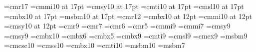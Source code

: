 
%





\font\titlefont=cmr17
\font\titlei=cmmi10 at 17pt
\font\titlesy=cmsy10 at 17pt
\font\titleit=cmti10 at 17pt
\font\titlesl=cmsl10 at 17pt
\font\titlebf=cmbx10 at 17pt
\font\Bbbt=msbm10 at 17pt
\font\twelverm=cmr12
\font\twelvebf=cmbx10 at 12pt
\font\twelvei=cmmi10 at 12pt
\font\twelvesy=cmsy10 at 12pt
\font\ninerm=cmr9
\font\sevenrm=cmr7
\font\sixrm=cmr6
\font\fiverm=cmr5
\font\ninei=cmmi9
\font\seveni=cmmi7
\font\ninesy=cmsy9
\font\sevensy=cmsy9
\font\tenbf=cmbx10
\font\sixbf=cmbx6
\font\fivebf=cmbx5
\font\ninebf=cmbx9
\font\nineit=cmti9
\font\ninesl=cmsl9
\font\nineex=cmex9
\font\nineBbb=msbm9
\font\cmsc=cmcsc10
\font\dfont=cmss10
\font\dfont=cmbx10
\font\efont=cmti10
\font\Bbb=msbm10
\font\Bbbs=msbm7

\def\ninepoint{\def\rm{\fam0\ninerm}
    \textfont0 = \ninerm
    \textfont1 = \ninei
    \textfont2 = \ninesy
    \textfont3 = \nineex
    \scriptfont0 = \sevenrm
    \scriptfont1 = \seveni
    \scriptfont2 = \sevensy
    \scriptscriptfont0 = \fiverm
    \scriptscriptfont1 = \fivei
    \scriptscriptfont2 = \fivesy
    \textfont\itfam=\nineit \def\it{\fam\itfam\nineit}
    \textfont\bffam=\ninebf \scriptfont\bffam=\sixbf
    \scriptscriptfont\bffam=\fivebf \def\bf{\fam\bffam\ninebf}
    \textfont\slfam=\ninesl \def\sl{\fam\slfam\ninesl}
    \let\Bbb\nineBbb
    \baselineskip 10pt}

